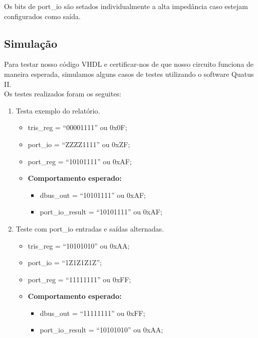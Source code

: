 \documentclass{article}
\begin{document}
Os bits de port\_io são setados individualmente a alta impedância caso estejam configurados como saída.

\subsection{Simulação}

Para testar nosso código VHDL e certificar-nos de que nosso circuito funciona de maneira esperada, simulamos alguns casos de testes utilizando o software Quatus II.\\

Os testes realizados foram os seguites:

\begin{enumerate}
    \item Testa exemplo do relatório.
    \begin{itemize}
        \item tris\_reg = ``00001111'' ou 0x0F;
        \item port\_io  = ``ZZZZ1111'' ou 0xZF;
        \item port\_reg = ``10101111'' ou 0xAF;
        \item \textbf{Comportamento esperado:}
        \begin{itemize}
            \item dbus\_out = ``10101111'' ou 0xAF;
            \item port\_io\_result =  ``10101111'' ou 0xAF;
        \end{itemize}
    \end{itemize}

    \item Teste com port\_io entradas e saídas alternadas.
    \begin{itemize}
        \item tris\_reg = ``10101010'' ou 0xAA;
        \item port\_io  = ``1Z1Z1Z1Z'';
        \item port\_reg = ``11111111'' ou 0xFF;
        \item \textbf{Comportamento esperado:}
        \begin{itemize}
            \item dbus\_out = ``11111111'' ou 0xFF;
            \item port\_io\_result =  ``10101010'' ou 0xAA;
        \end{itemize}
    \end{itemize}


\end{enumerate}
\end{document}
